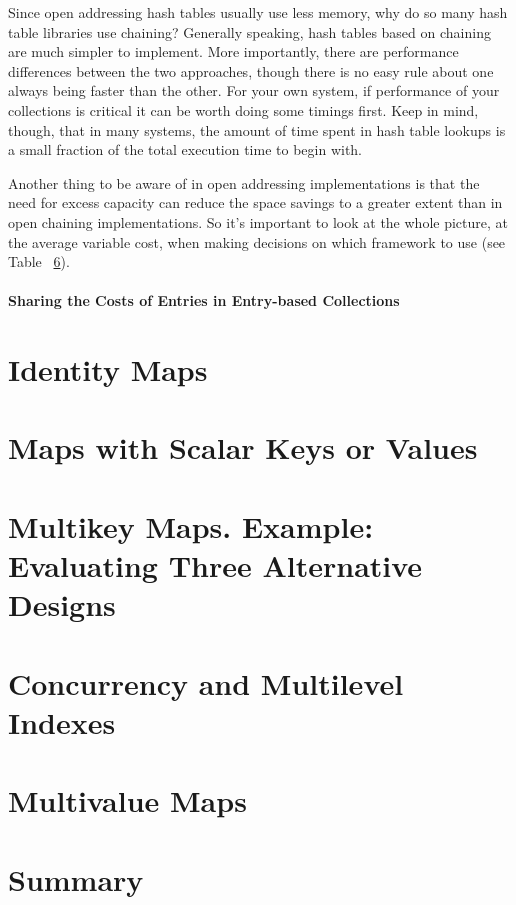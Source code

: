 Since open addressing hash tables usually use less memory, why do so many hash
table libraries use chaining? Generally speaking, hash tables based
on chaining are much simpler to implement. More importantly, there
are performance differences between the two approaches, though there is no easy
rule about one always being faster than the other. For your
own system, if performance of your collections is critical it can be worth doing
some timings first.  Keep in mind, though, that in many systems, the amount of time spent in
hash table lookups is a small fraction of the total execution time to begin with. 

Another thing to be aware of in open addressing implementations is that the
need for excess capacity can reduce the space savings to a greater
extent than in open chaining implementations. So it's important to look at the whole
picture, at the average variable cost, when making decisions on which framework
to use (see Table ~\ref{}).


\paragraph{Sharing the Costs of Entries in Entry-based Collections}

\section{Identity Maps}

\section{Maps with Scalar Keys or Values}

\section{Multikey Maps. Example: Evaluating Three Alternative Designs}

\section{Concurrency and Multilevel Indexes}

\section{Multivalue Maps}

\section{Summary}



